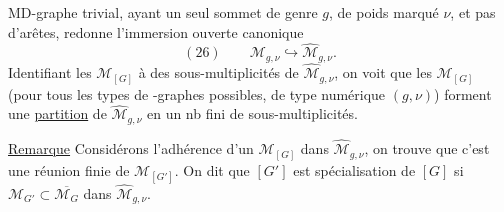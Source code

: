 MD-graphe trivial, ayant un seul sommet de genre $g$, de poids marqué $\nu$, et pas d'arêtes, redonne l'immersion ouverte canonique
\[
(26)\qquad\mathcal M_{g,\nu}\hookrightarrow\widehat{\mathcal M}_{g,\nu}.
\]
Identifiant les $\mathcal M_{[G]}$ à des sous-multiplicités de $\widehat{\mathcal M}_{g,\nu}$, on voit que les $\mathcal M_{[G]}$ (pour tous les types de -graphes possibles, de type numérique $(g,\nu)$) forment une \uline{partition} de $\widehat{\mathcal M}_{g,\nu}$ en un nb fini de sous-multiplicités.

\uline{Remarque} Considérons l'adhérence d'un $\mathcal M_{[G]}$ dans $\widehat{\mathcal M}_{g,\nu}$, on trouve que c'est une réunion finie de $\mathcal M_{[G']}$. On dit que $[G']$ est spécialisation de $[G]$ si $\mathcal M_{G'}\subset\overline{\mathcal M_G}$ dans $\widehat{\mathcal M}_{g,\nu}$.
